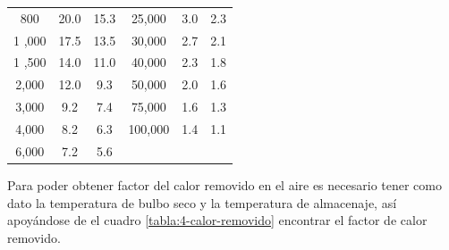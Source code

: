 \begin{table}[H]
\begin{tabular}{cccccc}
 		800                                                                      & 20.0                                 & 15.3                                 & 25,000                                & 3.0                                 & 2.3                                 \\
 		1 ,000                                                                   & 17.5                                 & 13.5                                 & 30,000                                & 2.7                                 & 2.1                                 \\
 		1 ,500                                                                   & 14.0                                 & 11.0                                 & 40,000                                & 2.3                                 & 1.8                                 \\
 		2,000                                                                    & 12.0                                 & 9.3                                  & 50,000                                & 2.0                                 & 1.6                                 \\
 		3,000                                                                    & 9.2                                  & 7.4                                  & 75,000                                & 1.6                                 & 1.3                                 \\
 		4,000                                                                    & 8.2                                  & 6.3                                  & 100,000                               & 1.4                                 & 1.1                                 \\
 		6,000                                                                    & 7.2                                  & 5.6                                  &                                       &                                     &                                     \\ \hline
 	\end{tabular}
 	\end{table}
 	
 	
 	Para poder obtener factor del calor removido en el aire es necesario tener como dato la
 	temperatura de bulbo seco y la temperatura de almacenaje, así apoyándose de el cuadro \ref{tabla:4-calor-removido} encontrar el factor de calor removido.
 
